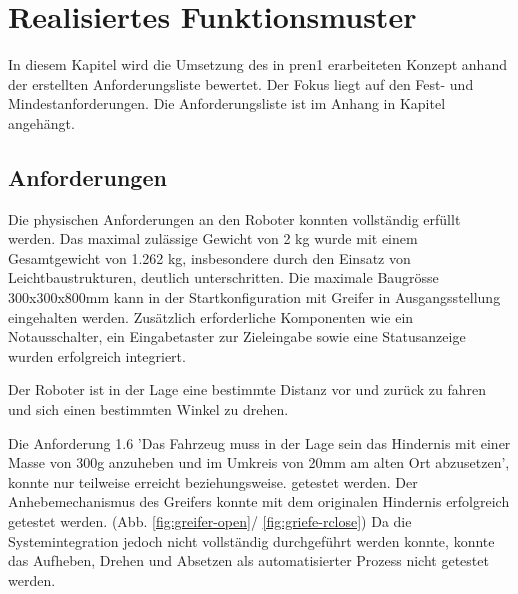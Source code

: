 \section{Realisiertes Funktionsmuster}

In diesem Kapitel wird die Umsetzung des in \acrshort{pren1} erarbeiteten Konzept anhand der  erstellten Anforderungsliste bewertet. Der Fokus liegt auf den Fest- und Mindestanforderungen. Die Anforderungsliste ist im Anhang in Kapitel  angehängt.

\subsection{Anforderungen}

Die physischen Anforderungen an den Roboter konnten vollständig erfüllt werden. Das maximal zulässige Gewicht von 2 kg wurde mit einem Gesamtgewicht von 1.262 kg, insbesondere durch den Einsatz von Leichtbaustrukturen, deutlich unterschritten. Die maximale Baugrösse 300x300x800mm kann in der Startkonfiguration mit Greifer in Ausgangsstellung eingehalten werden. Zusätzlich erforderliche Komponenten wie ein Notausschalter, ein Eingabetaster zur Zieleingabe sowie eine Statusanzeige wurden erfolgreich integriert.

Der Roboter ist in der Lage eine bestimmte Distanz vor und zurück zu fahren und sich einen bestimmten Winkel zu drehen.

Die Anforderung 1.6 'Das Fahrzeug muss in der Lage sein das Hindernis mit  einer Masse von 300g anzuheben und im Umkreis von 20mm am alten Ort abzusetzen', konnte nur teilweise erreicht beziehungsweise. getestet werden. Der Anhebemechanismus des Greifers konnte mit dem originalen Hindernis erfolgreich getestet werden. (Abb. \ref{fig:greifer-open}/ \ref{fig:griefe-rclose}) Da die Systemintegration jedoch nicht vollständig durchgeführt werden konnte, konnte das Aufheben, Drehen und Absetzen als automatisierter Prozess nicht getestet werden.


